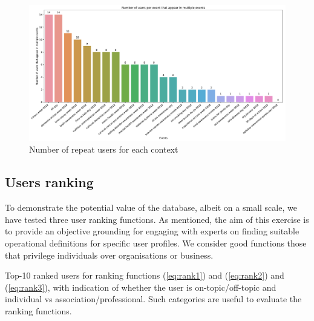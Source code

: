 \begin{figure}[htb]
	\centering
	\includegraphics[width=1.2\textwidth]{figures/repeat-users-frequency}
	\caption{Number of repeat users for each context}
	\label{fig:repeat-users-frequency}
\end{figure}

\vspace{-15pt}
\subsection{Users ranking} \label{sec:ranking}
\vspace{-5pt}

To demonstrate the potential value of the database, albeit on a small scale, we have tested three user ranking functions.
As mentioned, the aim of this exercise is to provide an objective grounding for engaging with experts on finding suitable operational definitions for specific user profiles. We consider good functions those that privilege individuals over organisations or business.
%
\begin{table}
	\centering
	\footnotesize
	\resizebox{\textwidth}{!}{
		
	}
	\caption{Top-10 ranked users for ranking functions (\ref{eq:rank1}) and (\ref{eq:rank2}) and (\ref{eq:rank3}), with indication of whether the user is on-topic/off-topic and individual vs association/professional. Such categories are useful to evaluate the ranking functions.}
	\label{tab:rank1}
	\vspace{-20pt}
\end{table}
%

